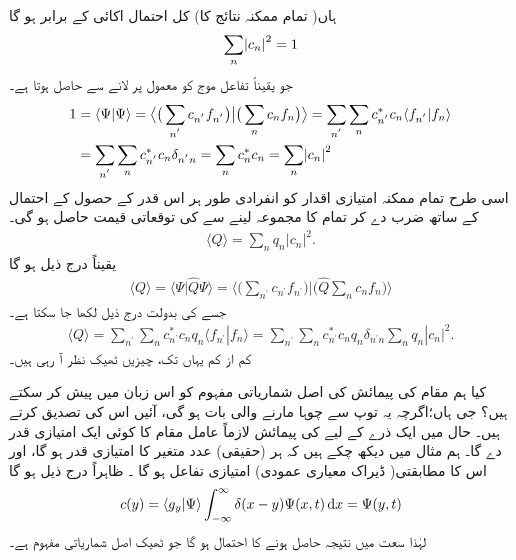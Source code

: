  ہاں( تمام ممکنہ نتائج کا) کل احتمال اکائی کے برابر ہو گا
\begin{align}
\sum_{n} \abs{c_{n}}^{2} = 1
\end{align}
جو یقیناً تفاعل موج کو معمول پر لانے سے حاصل ہوتا ہے۔
\begin{gather}
\begin{aligned}
1 &= \langle \Psi | \Psi \rangle = \big\langle \big( \sum_{n^{'}}c_{n^{'}}f_{n^{'}}\big) \big | \big( \sum_{n} c_{n}f_{n} \big) \big\rangle = \sum_{n^{'}}\sum_{n} c_{n^{'}}^{*}c_{n}\langle f_{n^{'}} | f_{n} \rangle \\
&= \sum_{n^{'}}\sum_{n} c_{n^{'}}^{*}c_{n} \delta_{n^{'}n} = \sum_{n}c_{n}^{*}c_{n} = \sum_{n}\abs{c_{n}}^{2}
\end{aligned}
\end{gather}
اسی طرح تمام ممکنہ امتیازی اقدار کو انفرادی طور ہر اس قدر کے حصول کے احتمال کے ساتھ ضرب دے کر تمام کا مجموعہ لینے سے  کی توقعاتی قیمت حاصل ہو گی۔
\begin{align}
\langle Q \rangle = \sum_{n}q_{n}|c_{n}|^{2}.
\end{align}
یقیناً درج ذیل ہو گا 
\begin{align}
\langle Q \rangle = \langle \Psi | \hat{Q} \Psi \rangle = \big\langle \big( \sum_{n^{'}}c_{n^{'}}f_{n^{'}}\big) \big | \big( \hat{Q} \sum_{n} c_{n}f_{n} \big) \big \rangle
\end{align}
جسے  کی بدولت درج ذیل لکھا جا سکتا ہے۔
\begin{align}
\langle Q \rangle = \sum_{n^{'}}\sum_{n} c_{n^{'}}^{*}c_{n} q_{n} \langle f_{n^{'}} | f_{n} \rangle = \sum_{n^{'}}\sum_{n} c_{n^{'}}^{*}c_{n} q_{n} \delta_{n^{'}n} \sum_{n}q_{n}|c_{n}|^{2}.
\end{align}
کم از کم یہاں تک، چیزیں ٹھیک نظر آ رہی ہیں۔

کیا ہم مقام کی پیمائش کی اصل شماریاتی مفہوم کو اس زبان میں پیش کر سکتے ہیں؟ جی ہاں؛اگرچہ یہ توپ سے چوہا مارنے والی بات ہو گی، آئیں اس کی تصدیق کرتے ہیں۔ حال  میں ایک ذرے کے لیے  کی پیمائش لازماً عامل مقام کا کوئی ایک امتیازی قدر دے گا۔ ہم مثال  میں دیکھ چکے ہیں کہ ہر (حقیقی) عدد  متغیر  کا امتیازی قدر ہو گا، اور اس کا مطابقتی( ڈیراک معیاری عمودی) امتیازی تفاعل  ہو گا ۔ ظاہراً درج ذیل ہو گا
\begin{align}
c(y) = \langle g_{y} | \Psi \rangle \int_{-\infty}^{\infty} \delta(x-y) \Psi(x,t)\dif x = \Psi(y,t)
\end{align}
لہٰذا سعت  میں نتیجہ حاصل ہونے کا احتمال  ہو گا جو ٹھیک اصل شماریاتی مفہوم ہے۔

